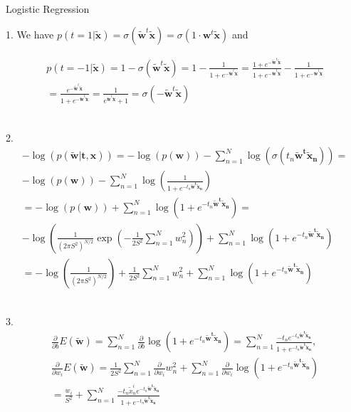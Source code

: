 \documentclass[english]{exercisesheet}
\author{Lorenzo Minecci, Daniel Strenger}
\begin{document}
 \makedocumentheader
 
 \begin{nexercise}{Logistic Regression}
\end{nexercise}

\begin{solution}
 1. We have $p(t=1|\bm{\tilde{x}})=\sigma(\bm{\tilde{w}}^t\bm{\tilde{x}})=\sigma(1\cdot\bm{w}^t\bm{\tilde{x}})$ and

 \begin{align*}
 p(t=-1|\bm{\tilde{x}})=1-\sigma(\bm{\tilde{w}}^t\bm{\tilde{x}})=1-\frac{1}{1+e^{-\bm{\tilde{w}}^t\bm{\tilde{x}}}}=\frac{1+e^{-\bm{\tilde{w}}^t\bm{\tilde{x}}}}{1+e^{-\bm{\tilde{w}}^t\bm{\tilde{x}}}}-\frac{1}{1+e^{-\bm{\tilde{w}}^t\bm{\tilde{x}}}}\\=\frac{e^{-\bm{\tilde{w}}^t\bm{\tilde{x}}}}{1+e^{-\bm{\tilde{w}}^t\bm{\tilde{x}}}}=\frac{1}{e^{\bm{\tilde{w}}^t\bm{\tilde{x}}}+1}=\sigma(-\bm{\tilde{w}}^t\bm{\tilde{x}})
\end{align*}\\
\par 2.
\begin{align*}
 -\log (p(\bm{\tilde{w}}|\bm{t},\bm{x}))=-\log(p(\bm{w}))-\sum_{n=1}^N \log(\sigma(t_n\bm{\tilde{w}^t\tilde{x}_n}))=\\-\log(p(\bm{w}))-\sum_{n=1}^N \log(\frac{1}{1+e^{-t_n\bm{\tilde{w}^t\tilde{x}_n}}})\\
 =-\log(p(\bm{w}))+\sum_{n=1}^N \log(1+e^{-t_n\bm{\tilde{w}^t\tilde{x}_n}})=\\-\log\left(\frac{1}{(2\pi S^{2})^{N/2}}\exp\left(-\frac{1}{2S^{2}}\sum_{n=1}^N w_n^2\right)\right)+\sum_{n=1}^N \log(1+e^{-t_n\bm{\tilde{w}^t\tilde{x}_n}})\\
 =-\log\left(\frac{1}{(2\pi S^{2})^{N/2}}\right)+\frac{1}{2S^{2}}\sum_{n=1}^N w_n^2+\sum_{n=1}^N \log(1+e^{-t_n\bm{\tilde{w}^t\tilde{x}_n}})
\end{align*}\\
\par 3.
\begin{align*}
 \frac{\partial}{\partial b}E(\bm{\tilde{w}})=\sum_{n=1}^N\frac{\partial}{\partial b} \log(1+e^{-t_n\bm{\tilde{w}^t\tilde{x}_n}})=\sum_{n=1}^N\frac{-t_ne^{-t_n\bm{\tilde{w}^t\tilde{x}_n}}}{1+e^{-t_n\bm{\tilde{w}^t\tilde{x}_n}}},\\
 \frac{\partial}{\partial w_i}E(\bm{\tilde{w}})=\frac{1}{2S^{2}}\sum_{n=1}^N  \frac{\partial}{\partial w_i} w_n^2+\sum_{n=1}^N\frac{\partial}{\partial w_i} \log(1+e^{-t_n\bm{\tilde{w}^t\tilde{x}_n}})\\
 =\frac{w_i}{S^{2}}+\sum_{n=1}^N\frac{-t_n\tilde{x}_n^ie^{-t_n\bm{\tilde{w}^t\tilde{x}_n}}}{1+e^{-t_n\bm{\tilde{w}^t\tilde{x}_n}}}
\end{align*}

\end{solution}

 
\end{document}
